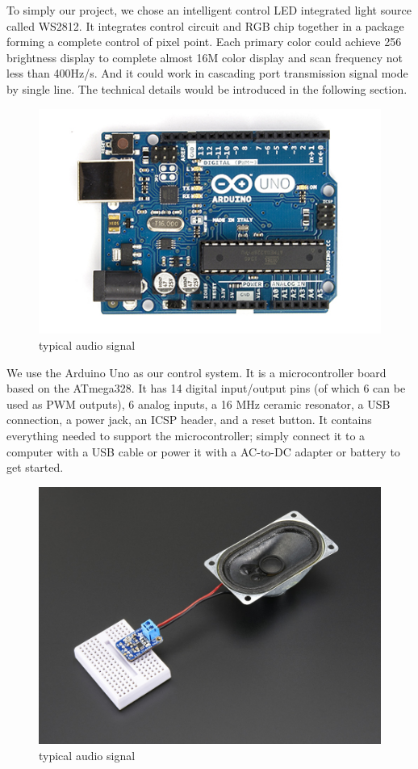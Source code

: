 \documentclass[12pt,a4paper,journal]{IEEEtran}
\begin{document}
To simply our project, we chose an intelligent control LED integrated light source called WS2812. It integrates control circuit and RGB chip together in a package forming a complete control of pixel point. Each primary color could achieve 256 brightness display to complete almost 16M color display and scan frequency not less than 400Hz/s. And it could work in cascading port transmission signal mode by single line. The technical details would be introduced in the following section.
\begin{figure}[ht]
  \centering
  \includegraphics[width=0.9\linewidth]{arduino.jpg}
  \caption{typical audio signal}
  \label{fig:tas4}
\end{figure}
We use the Arduino Uno as our control system. It is a microcontroller board based on the ATmega328. It has 14 digital input/output pins (of which 6 can be used as PWM outputs), 6 analog inputs, a 16 MHz ceramic resonator, a USB connection, a power jack, an ICSP header, and a reset button. It contains everything needed to support the microcontroller; simply connect it to a computer with a USB cable or power it with a AC-to-DC adapter or battery to get started.
\begin{figure}[ht]
  \centering
  \includegraphics[width=0.9\linewidth]{audioamp.jpg}
  \caption{typical audio signal}
  \label{fig:tas5}
\end{figure}
\end{document}
